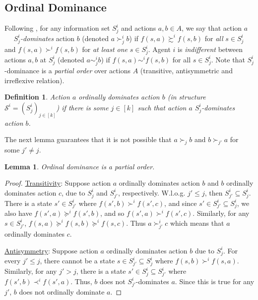 \documentclass[letterpaper]{article} %
\def\calS{\mathcal{S}}
\newtheorem{lemma}[theorem]{Lemma}
\newtheorem{definition}{Definition}
\begin{document}
\subsection{Ordinal Dominance}
Following \cite{CWX11,RE12,MLR14}, for any information set $S^i_j$ and actions $a,b\in A$, we say that action $a$~~ {\it $S^i_j$-dominates} action $b$ (denoted $a \succ^i_{j} b$) if $f(s,a) \succsim^i f(s,b)$ for \emph{all} $s\in S^i_j$ and $f(s,a) \succ^i f(s,b)$ for \emph{at least one} $s\in S^i_j$. Agent $i$ is \emph{indifferent} between actions $a,b$ at $S^i_j$ (denoted $a \sim^i_{j} b$) if $f(s,a) \sim^i f(s,b)$ for all $s\in S^i_j$. Note that $S^i_j$-dominance is a \emph{partial order} over actions $A$ (transitive, antisymmetric and irreflexive relation). 

\begin{definition}
Action $a$ \emph{ordinally dominates} action $b$ (in structure $\calS^i =(S^i_j)_{j\in [k]}$) if
there is some $j \in [k]$ such that action $a$ $S^i_j$-dominates action $b$.
\end{definition}

The next lemma guarantees that it is not possible that $a \succ_j b$ and $b \succ_{j'} a$ for some $j'\neq j$.
\begin{lemma}Ordinal dominance is a partial order.
\end{lemma}
\begin{proof}
\underline{Transitivity}: Suppose action $a$ ordinally dominates action $b$ and $b$ ordinally dominates action $c$, due to $S^i_j$ and $S^i_{j'}$, respectively. W.l.o.g. $j'\leq j$, then $S^i_{j'} \subseteq S^i_{j}$. There is a state $s'\in S^i_{j'}$ where $f(s',b) \succ^i f(s',c)$, and since $s'\in S^i_{j'}\subseteq S^i_{j}$, we also have $f(s',a) \succeq^i f(s',b)$, and so $f(s',a)\succ^i f(s',c)$. Similarly, for any $s\in S^i_{j'}$, $f(s,a) \succeq^i f(s,b) \succeq^i f(s,c)$. Thus $a \succ^i_{j'} c$ which means that $a$ ordinally dominates $c$. 

\underline{Antisymmetry}: Suppose action $a$ ordinally dominates action $b$ due to $S^i_j$. For every $j'\leq j$, there cannot be a state $s\in S^i_{j'}\subseteq S^i_j$ where $f(s,b) \succ^i f(s,a)$. Similarly, for any $j'>j$, there is a state $s'\in S^i_j \subseteq S^i_{j'}$ where $f(s',b) \prec^i f(s',a)$. Thus, $b$ does not $S^i_{j'}$-dominates $a$. Since this is true for any $j'$, $b$ does not ordinally dominate $a$. 
\end{proof}

\def\celcius{^\circ}
\end{document}
